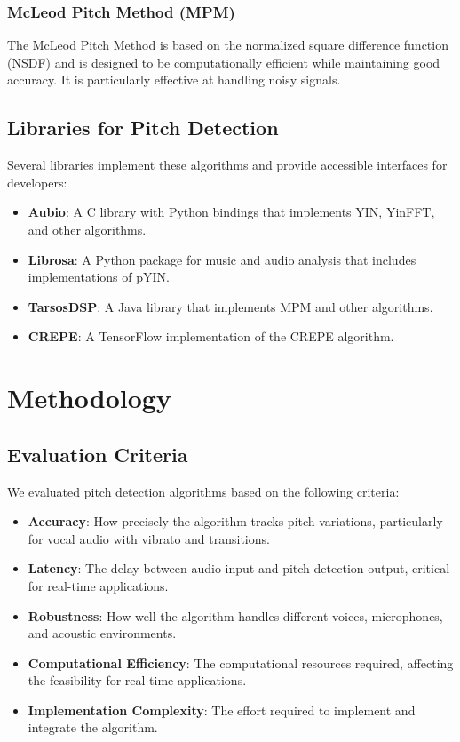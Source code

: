 \documentclass[conference]{IEEEtran}
\begin{document}
\subsubsection{McLeod Pitch Method (MPM)}
The McLeod Pitch Method \cite{mcleod2005fast} is based on the normalized square difference function (NSDF) and is designed to be computationally efficient while maintaining good accuracy. It is particularly effective at handling noisy signals.

\subsection{Libraries for Pitch Detection}
Several libraries implement these algorithms and provide accessible interfaces for developers:

\begin{itemize}
    \item \textbf{Aubio}: A C library with Python bindings that implements YIN, YinFFT, and other algorithms.
    \item \textbf{Librosa}: A Python package for music and audio analysis that includes implementations of pYIN.
    \item \textbf{TarsosDSP}: A Java library that implements MPM and other algorithms.
    \item \textbf{CREPE}: A TensorFlow implementation of the CREPE algorithm.
\end{itemize}

\section{Methodology}

\subsection{Evaluation Criteria}
We evaluated pitch detection algorithms based on the following criteria:
\begin{itemize}
    \item \textbf{Accuracy}: How precisely the algorithm tracks pitch variations, particularly for vocal audio with vibrato and transitions.
    \item \textbf{Latency}: The delay between audio input and pitch detection output, critical for real-time applications.
    \item \textbf{Robustness}: How well the algorithm handles different voices, microphones, and acoustic environments.
    \item \textbf{Computational Efficiency}: The computational resources required, affecting the feasibility for real-time applications.
    \item \textbf{Implementation Complexity}: The effort required to implement and integrate the algorithm.
\end{itemize}
\end{document}
